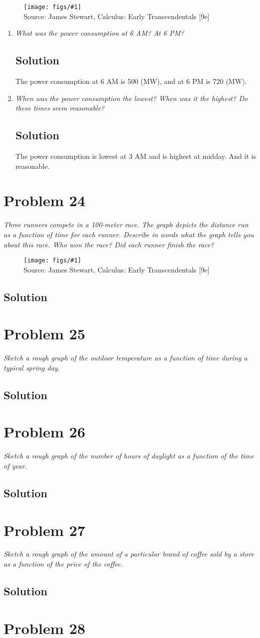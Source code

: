 \documentclass[11pt]{article}
\newcommand{\soln}{\subsection*}
\newcommand{\qn}{\textit}
\newcommand{\imagesource}[1]{{\footnotesize Source: #1}}
\newcommand{\img}[1]{
	\begin{figure}[h]
		\centering
		\texttt{[image: figs/\#1]}\\
		\imagesource{James Stewart, Calculus: Early Transcendentals [9e]}
	\end{figure}
}
\begin{document}
\img{1.1.23}

\begin{enumerate}
	\item \qn{What was the power consumption at 6 AM? At 6 PM?}
	\soln{Solution}
	The power consumption at 6 AM is 500 (MW), and at 6 PM is 720 (MW).
	
	\item \qn{When was the power consumption the lowest? When was it the highest? Do these times seem reasonable?}
	\soln{Solution}
	The power consumption is lowest at 3 AM and is highest at midday. And it is reasonable.
\end{enumerate}


\section*{Problem 24}

\qn{Three runners compete in a 100-meter race. The graph depicts the distance run as a function of time for each runner. Describe in words what the graph tells you about this race. Who won the race? Did each runner finish the race?}

\img{1.1.24}

\soln{Solution}

\section*{Problem 25}

\qn{Sketch a rough graph of the outdoor temperature as a function of time during a typical spring day.}

\soln{Solution}

\section*{Problem 26}

\qn{Sketch a rough graph of the number of hours of daylight as a function of the time of year.}

\soln{Solution}

\section*{Problem 27}

\qn{Sketch a rough graph of the amount of a particular brand of coffee sold by a store as a function of the price of the coffee.}

\soln{Solution}

\section*{Problem 28}
\end{document}
